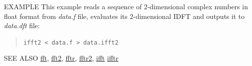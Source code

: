 \begin{qsection}{EXAMPLE}
This example reads a sequence of 2-dimensional complex numbers in float format
from {\em data.f} file, evaluates its 2-dimensional IDFT and outputs it to {\em
data.dft} file:
\begin{quote}
  \verb!ifft2 < data.f > data.ifft2!
\end{quote}
\end{qsection}

\begin{qsection}{SEE ALSO}
\hyperlink{fft}{fft},
\hyperlink{fft2}{fft2},
\hyperlink{fftr}{fftr},
\hyperlink{fftr2}{fftr2},
\hyperlink{ifft}{ifft}
\hyperlink{ifftr}{ifftr}
\end{qsection}
